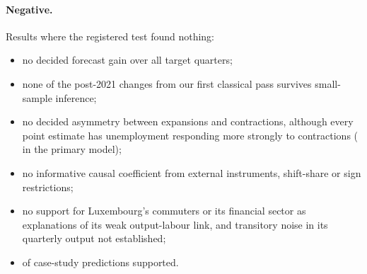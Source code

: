 \paragraph{Negative.} Results where the registered test found nothing:
\begin{itemize}
  \item no decided forecast gain over all target quarters;
  \item none of the  post-2021 changes from our first classical
    pass survives small-sample inference;
  \item no decided asymmetry between expansions and contractions, although every point
    estimate has unemployment responding more strongly to contractions
    ( in the primary model);
  \item no informative causal coefficient from external instruments, shift-share or sign
    restrictions;
  \item no support for Luxembourg's commuters or its financial sector as explanations of
    its weak output-labour link, and transitory noise in its quarterly output not
    established;
  \item {} of  case-study predictions supported.
\end{itemize}

